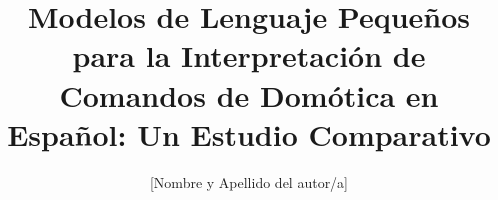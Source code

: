 \documentclass[runningheads]{llncs}
\begin{document}
\title{Modelos de Lenguaje Pequeños para la Interpretación de Comandos de
Domótica en Español: Un Estudio Comparativo}
\author{[Nombre y Apellido del autor/a]}
\maketitle













\end{document}
